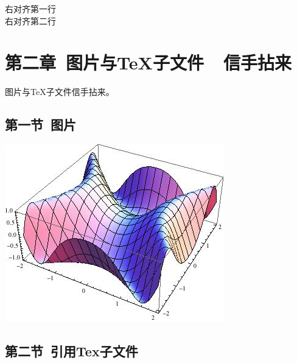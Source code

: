 \documentclass{ctexart}
\begin{document}
\begin{flushright}
右对齐第一行\\
右对齐第二行\\
\end{flushright}




\section{第二章\ 图片与TeX子文件\ \ 信手拈来}

图片与TeX子文件信手拈来。

\subsection{第一节\ 图片}

\begin{center}
\includegraphics[scale=0.4]{include_picture/picture.jpg}\par
\end{center}

\subsection{第二节\ 引用Tex子文件}


\end{document}

